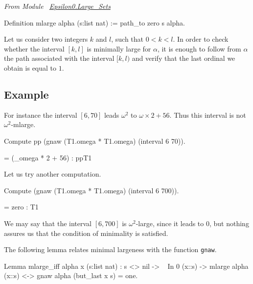 \vspace{4pt}

\noindent
\emph{From Module~ \href{../theories/html/hydras.Epsilon0.Large_Sets.html\#mlarge}{Epsilon0.Large\_Sets}}


\begin{Coqsrc}
Definition mlarge alpha (s:list nat) := path_to zero s alpha.
\end{Coqsrc}






Let us consider two integers $k$ and $l$, such that $0<k<l$. In order to check whether the interval $[k,l]$ is minimally large for $\alpha$, it is enough to
follow from $\alpha$ the path associated with the interval $[k,l)$ and verify that the last ordinal we obtain is equal to $1$.
 
\subsection{Example}

For instance the interval $[6,70]$ leads $\omega^2$ to $\omega\times 2 + 56$. Thus this interval is not $\omega^2$-mlarge.


\begin{Coqsrc}
Compute pp (gnaw (T1.omega * T1.omega) (interval 6 70)).
\end{Coqsrc}

\begin{Coqanswer}
 = (_omega * 2 + 56)%
     : ppT1
\end{Coqanswer}

Let us try another computation.

\begin{Coqsrc}
Compute (gnaw (T1.omega * T1.omega) (interval 6 700)).
\end{Coqsrc}

\begin{Coqanswer}
 = zero : T1
\end{Coqanswer}

We may say that the interval $[6,700]$ is $\omega^2$-large, since it leads to $0$, but nothing assures us that the condition of minimality is satisfied.

The following lemma relates minimal largeness with the function 
\texttt{gnaw}. 

\begin{Coqsrc}
Lemma mlarge_iff alpha x (s:list nat) :
  s <> nil -> ~ In 0 (x::s) ->
  mlarge alpha (x::s) <-> gnaw alpha (but_last x s) = one.
 \end{Coqsrc}


